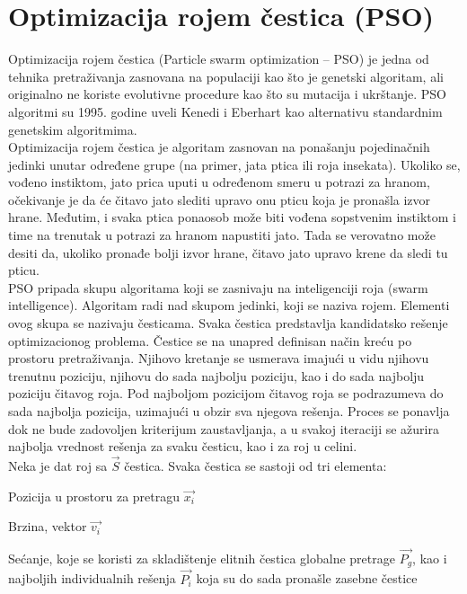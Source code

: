 \documentclass[a4paper]{article}
\begin{document}
\newpage


\section{Optimizacija rojem čestica (PSO)}
\label{sec:pso}
Optimizacija rojem čestica (Particle swarm optimization – PSO) je jedna od 
tehnika pretraživanja zasnovana na populaciji kao što je genetski algoritam, ali
originalno ne koriste evolutivne procedure kao što su mutacija i ukrštanje.
PSO algoritmi su 1995. godine uveli Kenedi i Eberhart kao 
alternativu standardnim genetskim algoritmima. \\

Optimizacija rojem čestica je algoritam zasnovan na ponašanju pojedinačnih jedinki unutar određene grupe (na primer, jata ptica ili roja insekata). Ukoliko se, vođeno instiktom, jato prica uputi u određenom smeru u potrazi za hranom, očekivanje je da će čitavo jato slediti upravo onu pticu koja je pronašla izvor hrane. Međutim, i svaka ptica ponaosob može biti vođena sopstvenim instiktom i time na trenutak u potrazi za hranom napustiti jato. Tada se verovatno može desiti da, ukoliko pronađe bolji izvor hrane, čitavo jato upravo krene da sledi tu pticu. \\

PSO pripada skupu algoritama koji se zasnivaju na inteligenciji roja (swarm intelligence). Algoritam radi nad skupom jedinki, koji se naziva rojem. Elementi ovog skupa se nazivaju česticama. 
Svaka čestica predstavlja kandidatsko rešenje optimizacionog problema. Čestice se na unapred definisan način kreću po prostoru pretraživanja. Njihovo kretanje se usmerava imajući u vidu njihovu trenutnu poziciju, njihovu do sada najbolju poziciju, kao i do sada najbolju poziciju čitavog roja. Pod najboljom pozicijom čitavog roja se podrazumeva do sada najbolja pozicija, uzimajući u obzir sva njegova rešenja. Proces se ponavlja dok ne bude zadovoljen kriterijum zaustavljanja, a u svakoj iteraciji se ažurira najbolja vrednost rešenja za svaku česticu, kao i za roj u celini. \\

Neka je dat roj sa $\vec{S}$ čestica. Svaka čestica se sastoji od tri elementa:
\begin{list}{•}{}
	\item Pozicija u prostoru za pretragu $\vec{x_i}$
	\item Brzina, vektor $\vec{v_i}$
	\item Sećanje, koje se koristi za skladištenje elitnih čestica globalne pretrage $\vec{P_g}$, kao i najboljih individualnih rešenja $\vec{P_i}$ koja su do sada pronašle zasebne čestice\\
\end{list}
\end{document}
